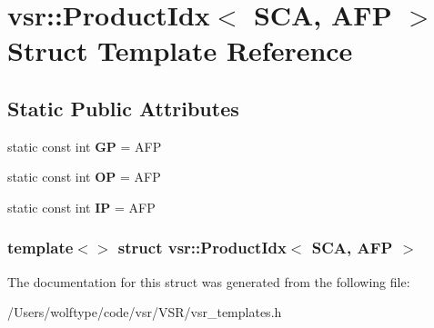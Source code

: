 \hypertarget{structvsr_1_1_product_idx_3_01_s_c_a_00_01_a_f_p_01_4}{\section{vsr\-:\-:Product\-Idx$<$ S\-C\-A, A\-F\-P $>$ Struct Template Reference}
\label{structvsr_1_1_product_idx_3_01_s_c_a_00_01_a_f_p_01_4}
}
\subsection*{Static Public Attributes}
\begin{DoxyCompactItemize}
\item 
\hypertarget{structvsr_1_1_product_idx_3_01_s_c_a_00_01_a_f_p_01_4_a5d964e24a8ab1fd13a8ab766aea8cd73}{static const int {\bfseries G\-P} = A\-F\-P}\label{structvsr_1_1_product_idx_3_01_s_c_a_00_01_a_f_p_01_4_a5d964e24a8ab1fd13a8ab766aea8cd73}

\item 
\hypertarget{structvsr_1_1_product_idx_3_01_s_c_a_00_01_a_f_p_01_4_a6bc81fac8ea89776294ab5454ea16b30}{static const int {\bfseries O\-P} = A\-F\-P}\label{structvsr_1_1_product_idx_3_01_s_c_a_00_01_a_f_p_01_4_a6bc81fac8ea89776294ab5454ea16b30}

\item 
\hypertarget{structvsr_1_1_product_idx_3_01_s_c_a_00_01_a_f_p_01_4_a0817c8fe0b8a36b1451641d8df5b05eb}{static const int {\bfseries I\-P} = A\-F\-P}\label{structvsr_1_1_product_idx_3_01_s_c_a_00_01_a_f_p_01_4_a0817c8fe0b8a36b1451641d8df5b05eb}

\end{DoxyCompactItemize}
\subsubsection*{template$<$$>$ struct vsr\-::\-Product\-Idx$<$ S\-C\-A, A\-F\-P $>$}



The documentation for this struct was generated from the following file\-:\begin{DoxyCompactItemize}
\item 
/\-Users/wolftype/code/vsr/\-V\-S\-R/vsr\-\_\-templates.\-h\end{DoxyCompactItemize}
